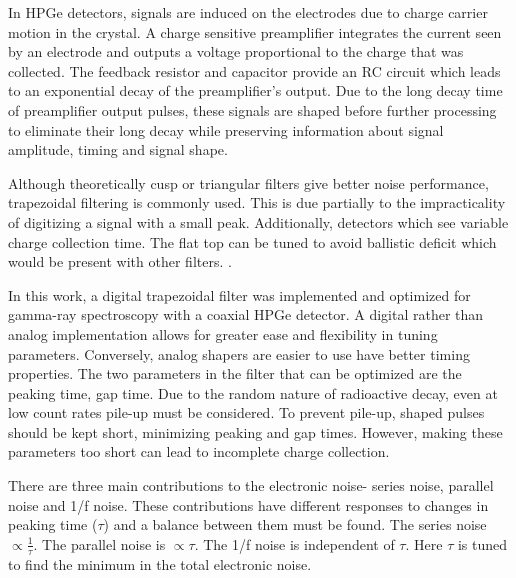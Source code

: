 In HPGe detectors, signals are induced on the electrodes due to charge carrier motion in the crystal. A charge sensitive preamplifier integrates the current seen by an electrode and outputs a voltage proportional to the charge that was collected. The feedback resistor and capacitor provide an RC circuit which leads to an exponential decay of the preamplifier's output. Due to the long decay time of preamplifier output pulses, these signals are shaped before further processing to eliminate their long decay while preserving information about signal amplitude, timing and signal shape.

Although theoretically cusp or triangular filters give better noise performance, trapezoidal filtering is commonly used. This is due partially to the impracticality of digitizing a signal with a small peak. Additionally, detectors which see variable charge collection time. The flat top can be tuned to avoid ballistic deficit which would be present with other filters. \cite{Knoll}.

In this work, a digital trapezoidal filter was implemented and optimized for gamma-ray spectroscopy with a coaxial HPGe detector. A digital rather than analog implementation allows for greater ease and flexibility in tuning parameters. Conversely, analog shapers are easier to use have better timing properties. The two parameters in the filter that can be optimized are the peaking time, gap time. Due to the random nature of radioactive decay, even at low count rates pile-up must be considered. To prevent pile-up, shaped pulses should be kept short, minimizing peaking and gap times. However, making these parameters too short can lead to incomplete charge collection.

There are three main contributions to the electronic noise- series noise, parallel noise and 1/f noise. These contributions have different responses to changes in peaking time ($\tau$) and a balance between them must be found. The series noise $\propto \frac{1}{\tau}$. The parallel noise is $\propto\tau$. The 1/f noise is independent of $\tau$. Here $\tau$ is tuned to find the minimum in the total electronic noise.